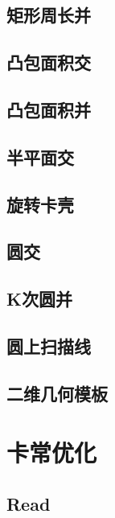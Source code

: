 \documentclass{article}
\begin{document}
\subsection{矩形周长并} 

\subsection{凸包面积交} 

\subsection{凸包面积并} 

\subsection{半平面交} 

\subsection{旋转卡壳} 

\subsection{圆交} 

\subsection{K次圆并} 

\subsection{圆上扫描线} 

\subsection{二维几何模板} 



\newpage %
\section{卡常优化} %
\subsection{Read} 

\end{document}
